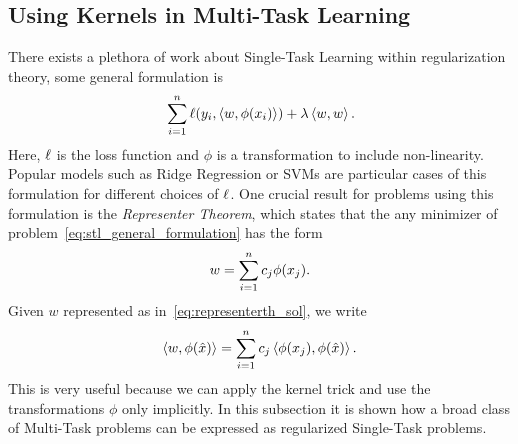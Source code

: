 \subsection{Using Kernels in Multi-Task Learning}
There exists a plethora of work about Single-Task Learning within regularization theory, some general formulation is
\begin{equation}
    \label{eq:stl_general_formulation}
    \begin{aligned}
        & \sum_{i=1}^{\nsamples} \lossf(y_i, \dotp{w}{\phi(x_i)}) + \lambda \dotp{w}{w} .\\
    \end{aligned}
\end{equation}
Here, $\ell$ is the loss function and $\phi$ is a transformation to include non-linearity. Popular models such as Ridge Regression or SVMs are particular cases of this formulation for different choices of $\ell$.
One crucial result for problems using this formulation is the \emph{Representer Theorem}, which states that the any minimizer of problem~\eqref{eq:stl_general_formulation} has the form
\begin{equation}
    \label{eq:representerth_sol}
    w = \sum_{i=1}^\nsamples c_j \phi(x_j) .
\end{equation}
Given $w$ represented as in~\eqref{eq:representerth_sol}, we write
\begin{equation}
    \nonumber
    \left\langle w, \phi(\hat{x}) \right\rangle = \sum_{i=1}^n c_j \left\langle \phi(x_j), \phi(\hat{x}) \right\rangle.
\end{equation}
This is very useful because we can apply the kernel trick and use the transformations $\phi$ only implicitly.
In this subsection it is shown how a broad class of Multi-Task problems can be expressed as regularized Single-Task problems.

